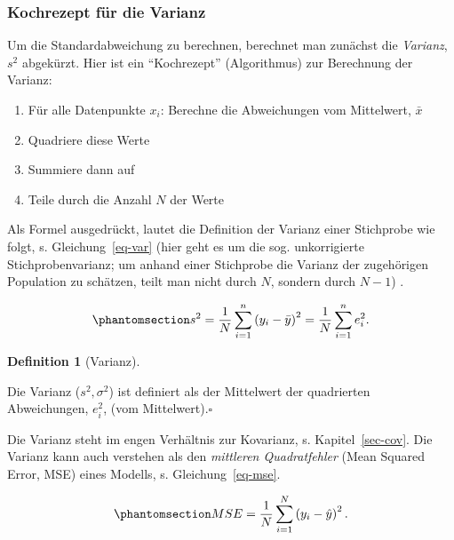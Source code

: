 \documentclass[
  letterpaper,
]{scrbook}
\providecommand{\tightlist}{%
  \setlength{\itemsep}{0pt}\setlength{\parskip}{0pt}}\usepackage{longtable,booktabs,array}
\theoremstyle{definition}
\theoremstyle{definition}
\newtheorem{definition}{Definition}[chapter]
\theoremstyle{definition}
\theoremstyle{remark}
\begin{document}
\subsubsection{Kochrezept für die
Varianz}\label{kochrezept-fuxfcr-die-varianz}

Um die Standardabweichung zu berechnen, berechnet man zunächst die
\emph{Varianz}, \(s^2\) abgekürzt. Hier ist ein ``Kochrezept''
(Algorithmus) zur Berechnung der Varianz:

\begin{enumerate}
\def\labelenumi{\arabic{enumi}.}
\tightlist
\item
  Für alle Datenpunkte \(x_i\): Berechne die Abweichungen vom
  Mittelwert, \(\bar{x}\)
\item
  Quadriere diese Werte
\item
  Summiere dann auf
\item
  Teile durch die Anzahl \(N\) der Werte
\end{enumerate}

Als Formel ausgedrückt, lautet die Definition der Varianz einer
Stichprobe wie folgt, s. Gleichung~\ref{eq-var} (hier geht es um die
sog. unkorrigierte Stichprobenvarianz; um anhand einer Stichprobe die
Varianz der zugehörigen Population zu schätzen, teilt man nicht durch
\(N\), sondern durch \(N-1\)) .

\begin{equation}\phantomsection\label{eq-var}{{\displaystyle s^{2}={\frac {1}{N}}\sum _{i=1}^{n}\left(y_{i}-{\bar {y}}\right)^{2}={\frac {1}{N}}\sum _{i=1}^{n}e_i^{2}.}}\end{equation}

\begin{definition}[Varianz]\protect\hypertarget{def-var}{}\label{def-var}

Die Varianz (\(s^2, \sigma^2\)) ist definiert als der Mittelwert der
quadrierten Abweichungen, \(e_i^2\), (vom Mittelwert).\(\square\)

\end{definition}

Die Varianz steht im engen Verhältnis zur Kovarianz, s.
Kapitel~\ref{sec-cov}. Die Varianz kann auch verstehen als den
\emph{mittleren Quadratfehler} (Mean Squared Error, MSE) eines Modells,
s. Gleichung~\ref{eq-mse}.

\begin{equation}\phantomsection\label{eq-mse}{{\displaystyle MSE={\frac {1}{N}}\sum _{i=1}^{N}\left(y_{i}-{\hat {y}}\right)^{2}.}}\end{equation}
\end{document}
